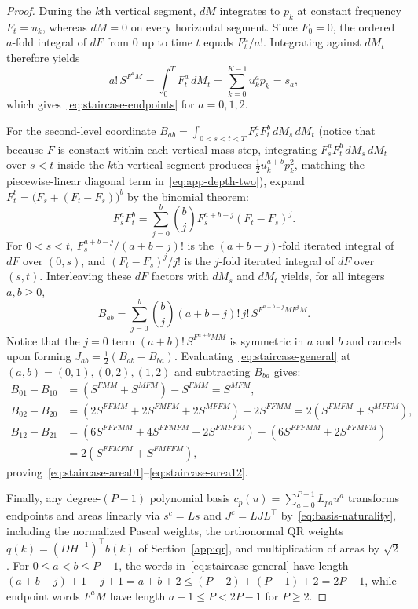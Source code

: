 \begin{proof}
During the \(k\)th vertical segment, \(dM\) integrates to \(p_k\) at constant
frequency \(F_t = u_k\), whereas \(dM = 0\) on every horizontal segment. Since
\(F_0 = 0\), the ordered \(a\)-fold integral of \(dF\) from \(0\) up to time
\(t\) equals \(F_t^a / a!\). Integrating against \(dM_t\) therefore yields
\[
 a!\,S^{F^a M} = \int_0^T F_t^a\,dM_t = \sum_{k=0}^{K-1} u_k^a p_k = s_a,
\]
which gives~\eqref{eq:staircase-endpoints} for \(a = 0, 1, 2\).

For the second-level coordinate \(B_{ab} = \int_{0 < s < t < T} F_s^a F_t^b\,dM_s\,dM_t\)
(notice that because \(F\) is constant within each vertical mass step, integrating
\(F_s^a F_t^b\,dM_s\,dM_t\) over \(s < t\) inside the \(k\)th vertical segment
produces \(\tfrac12 u_k^{a+b} p_k^2\), matching the piecewise-linear diagonal
term in~\eqref{eq:app-depth-two}), expand \(F_t^b = \bigl(F_s + (F_t - F_s)\bigr)^b\)
by the binomial theorem:
\[
 F_s^a F_t^b = \sum_{j=0}^b \binom{b}{j} F_s^{a+b-j} (F_t - F_s)^j.
\]
For \(0 < s < t\), \(F_s^{a+b-j} / (a+b-j)!\) is the \((a+b-j)\)-fold iterated
integral of \(dF\) over \((0, s)\), and \((F_t - F_s)^j / j!\) is the \(j\)-fold
iterated integral of \(dF\) over \((s, t)\). Interleaving these \(dF\) factors
with \(dM_s\) and \(dM_t\) yields, for all integers \(a, b \geq 0\),
\begin{equation}\label{eq:staircase-general}
 B_{ab} = \sum_{j=0}^b \binom{b}{j} (a + b - j)!\,j!\,S^{F^{a+b-j} M F^j M}.
\end{equation}
Notice that the \(j = 0\) term \((a+b)!\,S^{F^{a+b} M M}\) is symmetric in \(a\)
and \(b\) and cancels upon forming \(J_{ab} = \tfrac12(B_{ab} - B_{ba})\).
Evaluating~\eqref{eq:staircase-general} at \((a, b) = (0, 1), (0, 2), (1, 2)\)
and subtracting \(B_{ba}\) gives:
\begin{align*}
 B_{01} - B_{10} &= (S^{FMM} + S^{MFM}) - S^{FMM} = S^{MFM}, \\
 B_{02} - B_{20} &= (2S^{FFMM} + 2S^{FMFM} + 2S^{MFFM}) - 2S^{FFMM}
                  = 2(S^{FMFM} + S^{MFFM}), \\
 B_{12} - B_{21} &= (6S^{FFFMM} + 4S^{FFMFM} + 2S^{FMFFM})
                  - (6S^{FFFMM} + 2S^{FFMFM}) \\
                 &= 2(S^{FFMFM} + S^{FMFFM}),
\end{align*}
proving~\eqref{eq:staircase-area01}--\eqref{eq:staircase-area12}.

Finally, any degree-\((P-1)\) polynomial basis \(c_p(u) = \sum_{a=0}^{P-1} L_{pa} u^a\)
transforms endpoints and areas linearly via \(s^c = L s\) and \(J^c = L J L^\top\)
by~\eqref{eq:basis-naturality}, including the normalized Pascal weights, the
orthonormal QR weights \(q(k) = (D H^{-1})^\top b(k)\) of Section~\ref{app:qr},
and multiplication of areas by \(\sqrt 2\). For \(0 \leq a < b \leq P - 1\), the
words in~\eqref{eq:staircase-general} have length \((a + b - j) + 1 + j + 1 = a + b + 2 \leq (P - 2) + (P - 1) + 2 = 2P - 1\),
while endpoint words \(F^a M\) have length \(a + 1 \leq P < 2P - 1\) for
\(P \geq 2\).
\end{proof}

